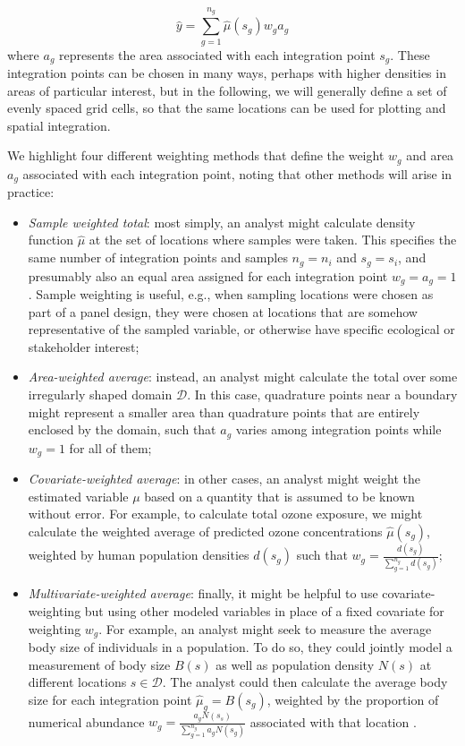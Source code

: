 \begin{equation} \label{eq:Chap6_sum}
   \hat{y} = \sum_{g=1}^{n_g} \hat\mu(s_g) w_g a_g 
\end{equation}
where \( a_g \) represents the area associated with each integration point \(s_g\).  These integration points can be chosen in many ways, perhaps with higher densities in areas of particular interest, but in the following, we will generally define a set of evenly spaced grid cells, so that the same locations can be used for plotting and spatial integration.

We highlight four different weighting methods that define the weight \(w_g\) and area \(a_g\) associated with each integration point, noting that other methods will arise in practice:
\begin{itemize}
    \item \textit{Sample weighted total}:  most simply, an analyst might calculate density function \(\hat \mu\) at the set of locations where samples were taken.  This specifies the same number of integration points and samples \(n_g = n_i\) and \(s_g = s_i\), and presumably also an equal area assigned for each integration point \( w_g=a_g=1 \).  Sample weighting is useful, e.g., when sampling locations were chosen as part of a panel design, they were chosen at locations that are somehow representative of the sampled variable, or otherwise have specific ecological or stakeholder interest;  

    \item \textit{Area-weighted average}: instead, an analyst might calculate the total over some irregularly shaped domain \(\mathcal{D}\).  In this case, quadrature points near a boundary might represent a smaller area than quadrature points that are entirely enclosed by the domain, such that \(a_g\) varies among integration points while \(w_g=1\) for all of them;

    \item \textit{Covariate-weighted average}:  in other cases, an analyst might weight the estimated variable \(\mu\) based on a quantity that is assumed to be known without error.  For example, to calculate total ozone exposure, we might calculate the weighted average of predicted ozone concentrations \(\hat\mu(s_g)\), weighted by human population densities \(d(s_g)\) such that \(w_g = \frac{d(s_g)}{\sum_{g=1}^{n_g} d(s_g)}\);   

    \item \textit{Multivariate-weighted average}: finally, it might be helpful to use covariate-weighting but using other modeled variables in place of a fixed covariate for weighting \(w_g\).  For example, an analyst might seek to measure the average body size of individuals in a population.  To do so, they could jointly model a measurement of body size \(B(s)\) as well as population density \(N(s)\) at different locations \( s \in \mathcal{D} \).  The analyst could then calculate the average body size for each integration point \(\hat{\mu}_g = B(s_g)\), weighted by the proportion of numerical abundance \(w_g = \frac{a_g N(s_s)}{\sum_{g=1}^{n_g} a_g N(s_g)} \) associated with that location \cite{gruss_developing_2019}.  

\end{itemize}
